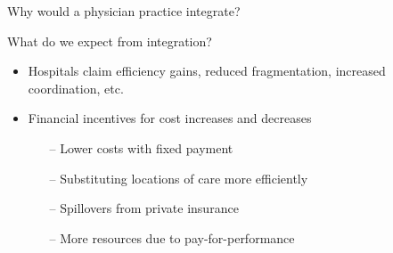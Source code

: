 \documentclass[t]{beamer}
\begin{document}
\begin{frame}{Why would a physician practice integrate?}

\end{frame}

\begin{frame}{What do we expect from integration?}
    \begin{itemize}
        \item Hospitals claim efficiency gains, reduced fragmentation, increased coordination, etc.
        \item Financial incentives for cost increases and decreases
        \begin{itemize}
            \item[--] Lower costs with fixed payment 
            \item[--] Substituting locations of care more efficiently
            \item[--] Spillovers from private insurance
            \item[--] More resources due to pay-for-performance
        \end{itemize}
    \end{itemize}
\end{frame}
\end{document}
